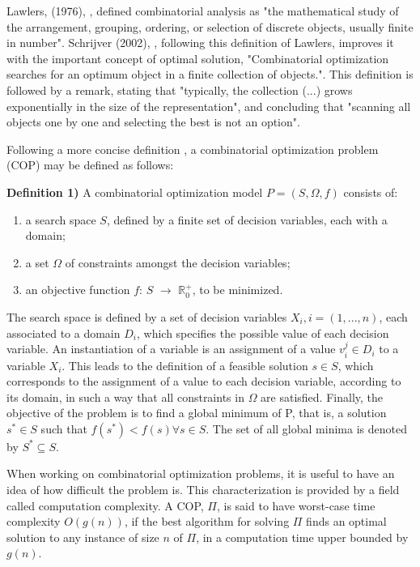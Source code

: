 
Lawlers, (1976), \cite{COP_book_lawler}, defined combinatorial analysis as "the mathematical study of the arrangement, grouping, ordering, or selection of discrete objects, usually finite in number". Schrijver (2002), \cite{COP_book}, following this definition of Lawlers, improves it with the important concept of optimal solution, "Combinatorial optimization searches for an optimum object in a finite collection of objects.". This definition is followed by a remark, stating that "typically, the collection (...) grows exponentially in the size of the representation", and concluding that "scanning all objects one by one and selecting the best is not an option".

Following a more concise definition \cite{aco_overview_advances}, a combinatorial optimization problem (COP) may be defined as follows:

\textbf{Definition 1)}  A combinatorial optimization model $P = (S,\Omega, f)$ consists of:
\begin{enumerate}
  \item a search space $S$, defined by a finite set of decision variables, each with a domain;
  \item a set $\Omega$ of constraints amongst the decision variables;
  \item an objective function $f$: $S$ $\rightarrow$ $\mathbb{R}_{0}^{+}$, to be minimized.
\end{enumerate}

The search space is defined by a set of decision variables $X_{i}, i = (1,...,n)$, each associated to a domain $D_{i}$, which specifies the possible value of each decision variable. An instantiation of a variable is an assignment of a value $v_{i}^{j} \in D_{i}$ to a variable $X_{i}$. This leads to the definition of a feasible solution $s \in S$, which corresponds to the assignment of a value to each decision variable, according to its domain, in such a way that all constraints in $\Omega$ are satisfied. Finally, the objective of the problem is to find a global minimum of P, that is, a solution $s^{*} \in S$ such that $f(s^{*}) < f(s) \forall s \in S$. The set of all global minima is denoted by $S^{*} \subseteq S$.

When working on combinatorial optimization problems, it is useful to have an idea of how difficult the problem is. This characterization is provided by a field called computation complexity. A COP, $\Pi$, is said to have worst-case time complexity  $O(g(n))$, if the best algorithm 
for solving $\Pi$ finds an optimal solution to any instance of size $n$ of $\Pi$,
in a computation time upper bounded by $g(n)$.

